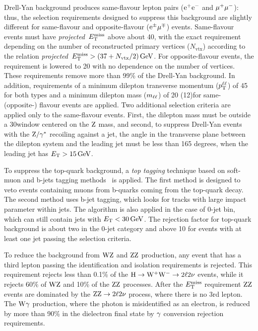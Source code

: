 \documentclass[11pt,twoside,a4paper,cmspaper,final,collab]{cms-tdr}
\begin{document}
Drell-Yan background produces same-flavour lepton pairs ($\mathrm{e}^+\mathrm{e}^-$ and ${\mu^+}{\mu^-}$):
thus, the selection requirements designed to suppress this background are slightly
different for same-flavour and opposite-flavour ($\mathrm{e}^{\pm}{\mu}^{\mp}$) events.
Same-flavour events must have \textit{projected}~$E_{\mathrm{T}}^{\text{miss}}$ above about 40\GeV,
with the exact requirement depending on the number of reconstructed primary vertices ($N_\text{vtx}$)
according to the relation \textit{projected}~$E_{\mathrm{T}}^{\text{miss}} >( 37 +N_\text{vtx}/ 2 )\,\text{Ge\hspace{-.08em}V}$.
For opposite-flavour events, the requirement is lowered to 20\GeV
with no dependence on the number of vertices.
These requirements remove more than 99\% of the Drell-Yan background.
In addition, requirements of a minimum dilepton transverse momentum ($p_{\mathrm{T}}^{\ell\ell}$)
of 45\GeV
for both types and a minimum dilepton mass ($m_{\mathrm{\ell}\mathrm{\ell}}$) of 20 (12)\GeV for same-
(opposite-) flavour events are applied.
Two additional selection criteria are applied only to the same-flavour events.
First, the dilepton mass must be outside a 30\GeV window centered on the $\mathrm{Z}$ mass,
and second, to suppress Drell-Yan events with the $\mathrm{Z}/\gamma^*$ recoiling against a jet, the angle
in the transverse plane between the dilepton system and the leading jet must be less
than 165 degrees, when the leading jet has $E_{\mathrm{T}}>15\,\text{Ge\hspace{-.08em}V}$.

To suppress the top-quark background, a \textit{top tagging} technique based
on soft-muon and b-jets tagging methods~\cite{btag1,btag2} is applied. The first
method is designed to veto events containing muons from b-quarks coming from the top-quark decay. The second
method uses b-jet tagging, which looks for tracks with large
impact parameter within jets. The algorithm is also applied in the
case of 0-jet bin, which can still contain jets with $E_{\mathrm{T}} <30\,\text{Ge\hspace{-.08em}V}$.
The rejection factor for top-quark background is about two in the 0-jet
category and above 10 for events with at least one jet passing the selection criteria.

To reduce the background from $\mathrm{W}\mathrm{Z}$ and $\mathrm{Z}\mathrm{Z}$ production, any event
that has a third lepton passing the identification and isolation requirements is rejected.
This requirement rejects less than 0.1\% of the $\mathrm{H}\to\mathrm{W^+}{}\mathrm{W^-} \to 2\ell2\nu$ events, while
it rejects 60\% of $\mathrm{W}\mathrm{Z}$ and 10\% of the $\mathrm{Z}\mathrm{Z}$ processes. After the $E_{\mathrm{T}}^{\text{miss}}$ requirement
$\mathrm{Z}\mathrm{Z}$ events are dominated by the $\mathrm{Z}\mathrm{Z} \to 2\ell 2\nu$ process,
where there is no 3rd lepton. The $\mathrm{W}\gamma$ production,
where the photon is misidentified as an electron, is reduced by more than 90\%
in the dielectron final state by $\gamma$ conversion rejection requirements.
\end{document}
